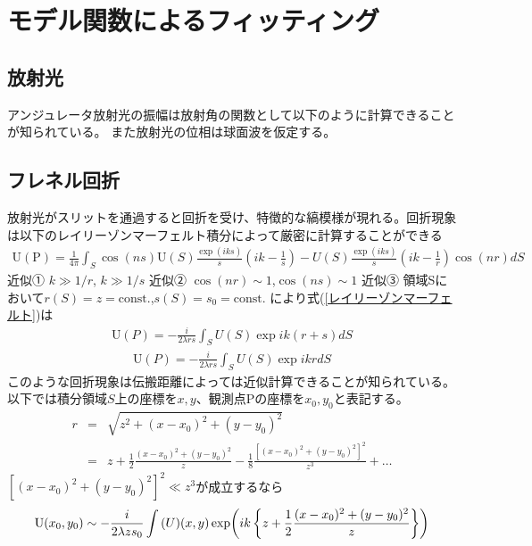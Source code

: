 \documentclass[a4paper,11pt,uplatex]{jsarticle}
\begin{document}
\section{モデル関数によるフィッティング}
\subsection{放射光}
アンジュレータ放射光の振幅は放射角の関数として以下のように計算できることが知られている。
また放射光の位相は球面波を仮定する。

\subsection{フレネル回折}
放射光がスリットを通過すると回折を受け、特徴的な縞模様が現れる。回折現象は以下のレイリーゾンマーフェルト積分によって厳密に計算することができる
\begin{eqnarray}
  \text{U}(\text{P}) = \frac{1}{4\pi}\int_{S}\cos(ns)\text{U}(S)\frac{\exp(iks)}{s}\left( ik - \frac{1}{s}\right) -U(S)\frac{\exp(iks)}{s}\left(ik- \frac{1}{r}\right)\cos(nr) dS
\label{レイリーゾンマーフェルト}
\end{eqnarray}
近似① $k \gg 1/r$, $k \gg 1/s$
近似② $\cos(nr) \sim 1$,$\cos(ns) \sim 1$
近似③ 領域Sにおいて$r(S)= z = \text{const.}$,$s(S) = s_0 = \text{const.}$
により式(\ref{レイリーゾンマーフェルト})は
\begin{eqnarray}
  \text{U}(P) = -\frac{i}{2\lambda rs} \int_{S} U(S)\exp ik(r+s) dS
  \label{レイリーゾンマーフェルト近似}
\end{eqnarray}
\begin{eqnarray}
  \text{U}(P) = -\frac{i}{2\lambda rs} \int_{S} U(S)\exp ikr dS
\end{eqnarray}
このような回折現象は伝搬距離によっては近似計算できることが知られている。以下では積分領域$S$上の座標を$x,y$、観測点Pの座標を$x_0,y_0$と表記する。
\begin{eqnarray}
  r &=& \sqrt{z^2 + (x-x_0)^2 + (y-y_0)^2}\\
  &=& z + \frac{1}{2}\frac{(x-x_0)^2 + (y-y_0)^2}{z} - \frac{1}{8}\frac{\left[(x-x_0)^2 + (y-y_0)^2\right]^2}{z^3} +\dots
\end{eqnarray}
$\left[(x-x_0)^2 + (y-y_0)^2\right]^2 \ll z^3$が成立するなら
\begin{eqnarray}
  \text{U}(x_0,y_0) \sim -\frac{i}{2\lambda zs_0}\int \text(U)(x,y) \exp(ik\left\{z +\frac{1}{2}\frac{(x-x_0)^2 + (y-y_0)^2}{z}\right\})
\end{eqnarray}
\end{document}

